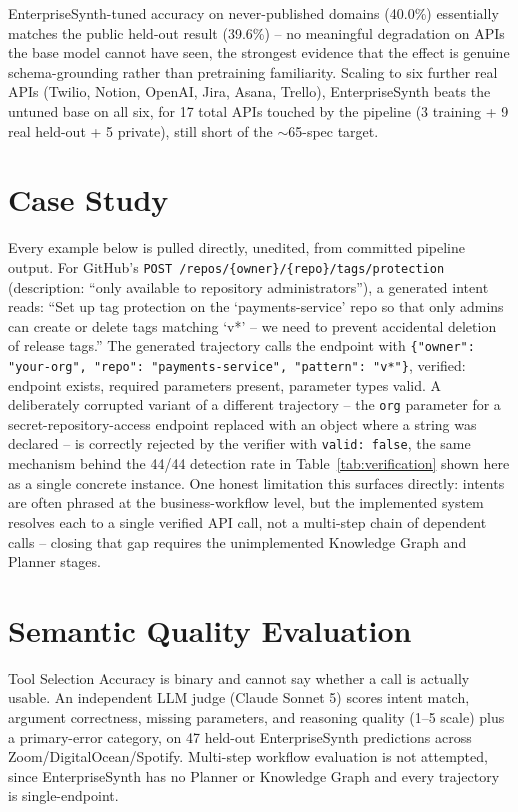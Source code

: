 \documentclass[letterpaper]{article} %
\begin{document}
EnterpriseSynth-tuned accuracy on never-published domains (40.0\%) essentially matches the public
held-out result (39.6\%) -- no meaningful degradation on APIs the base model cannot have seen,
the strongest evidence that the effect is genuine schema-grounding rather than pretraining
familiarity. Scaling to six further real APIs (Twilio, Notion, OpenAI, Jira, Asana, Trello),
EnterpriseSynth beats the untuned base on all six, for 17 total APIs touched by the pipeline
(3 training + 9 real held-out + 5 private), still short of the $\sim$65-spec target.

\section{Case Study}
Every example below is pulled directly, unedited, from committed pipeline output. For GitHub's
\texttt{POST /repos/\{owner\}/\{repo\}/tags/protection} (description: ``only available to
repository administrators''), a generated intent reads: ``Set up tag protection on the
`payments-service' repo so that only admins can create or delete tags matching `v*' -- we need to
prevent accidental deletion of release tags.'' The generated trajectory calls the endpoint with
\texttt{\{"owner": "your-org", "repo": "payments-service", "pattern": "v*"\}}, verified: endpoint
exists, required parameters present, parameter types valid. A deliberately corrupted variant of a
different trajectory -- the \texttt{org} parameter for a secret-repository-access endpoint replaced
with an object where a string was declared -- is correctly rejected by the verifier with
\texttt{valid: false}, the same mechanism behind the 44/44 detection rate in
Table~\ref{tab:verification} shown here as a single concrete instance. One honest limitation this
surfaces directly: intents are often phrased at the business-workflow level, but the implemented
system resolves each to a single verified API call, not a multi-step chain of dependent calls --
closing that gap requires the unimplemented Knowledge Graph and Planner stages.

\section{Semantic Quality Evaluation}
Tool Selection Accuracy is binary and cannot say whether a call is actually usable. An independent
LLM judge (Claude Sonnet 5) scores intent match, argument correctness, missing parameters, and
reasoning quality (1--5 scale) plus a primary-error category, on 47 held-out EnterpriseSynth
predictions across Zoom/DigitalOcean/Spotify. Multi-step workflow evaluation is not attempted,
since EnterpriseSynth has no Planner or Knowledge Graph and every trajectory is single-endpoint.
\end{document}
